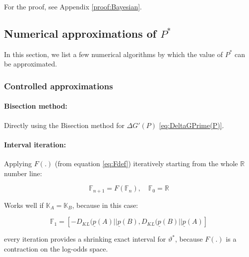\documentclass{article}
\theoremstyle{definition}
\begin{document}
For the proof, see Appendix \ref{proof:Bayesian}.



\subsection{Numerical approximations of $P^*$}
\label{sec:NumericalMethods}

In this section, we list a few numerical algorithms by which the value of $P^*$ can be approximated.

\subsubsection{Controlled approximations}

\paragraph{Bisection method:}

Directly using the Bisection method \cite{book:NumericalRecipes} for $\Delta G'(P)$ \eqref{eq:DeltaGPrime(P)}.

\paragraph{Interval iteration:}

Applying $F(.)$ (from equation \eqref{eq:Fdef}) iteratively starting from the whole $\mathbb{R}$ number line:

\begin{equation}
    \mathbb{F}_{n+1} = F(\mathbb{F}_n), \quad \mathbb{F}_0 = \mathbb{R}
\end{equation}

Works well if $\mathbb{K}_A=\mathbb{K}_B$, because in this case:

\begin{equation}
\label{eq:F1DKLbounds}
    \mathbb{F}_1 = [-D_{KL}(\underline{p}(A)||\underline{p}(B),D_{KL}(\underline{p}(B)||\underline{p}(A)]
\end{equation}

every iteration provides a shrinking exact interval for $\vartheta^*$, because $F(.)$ is a contraction on the log-odds space.
\end{document}
